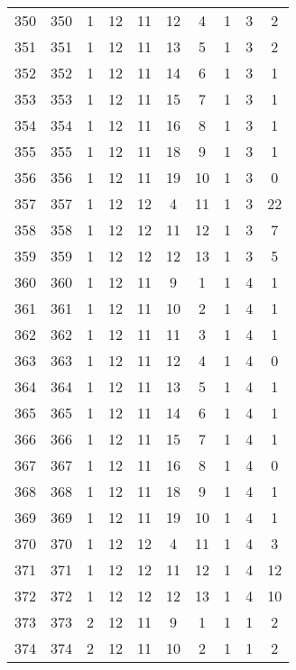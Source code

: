 \begin{longtable}{cccccccccc}
  350 & 350 &   1 &  12 &  11 &  12 &   4 &   1 &   3 &   2 \\ 
  351 & 351 &   1 &  12 &  11 &  13 &   5 &   1 &   3 &   2 \\ 
  352 & 352 &   1 &  12 &  11 &  14 &   6 &   1 &   3 &   1 \\ 
  353 & 353 &   1 &  12 &  11 &  15 &   7 &   1 &   3 &   1 \\ 
  354 & 354 &   1 &  12 &  11 &  16 &   8 &   1 &   3 &   1 \\ 
  355 & 355 &   1 &  12 &  11 &  18 &   9 &   1 &   3 &   1 \\ 
  356 & 356 &   1 &  12 &  11 &  19 &  10 &   1 &   3 &   0 \\ 
  357 & 357 &   1 &  12 &  12 &   4 &  11 &   1 &   3 &  22 \\ 
  358 & 358 &   1 &  12 &  12 &  11 &  12 &   1 &   3 &   7 \\ 
  359 & 359 &   1 &  12 &  12 &  12 &  13 &   1 &   3 &   5 \\ 
  360 & 360 &   1 &  12 &  11 &   9 &   1 &   1 &   4 &   1 \\ 
  361 & 361 &   1 &  12 &  11 &  10 &   2 &   1 &   4 &   1 \\ 
  362 & 362 &   1 &  12 &  11 &  11 &   3 &   1 &   4 &   1 \\ 
  363 & 363 &   1 &  12 &  11 &  12 &   4 &   1 &   4 &   0 \\ 
  364 & 364 &   1 &  12 &  11 &  13 &   5 &   1 &   4 &   1 \\ 
  365 & 365 &   1 &  12 &  11 &  14 &   6 &   1 &   4 &   1 \\ 
  366 & 366 &   1 &  12 &  11 &  15 &   7 &   1 &   4 &   1 \\ 
  367 & 367 &   1 &  12 &  11 &  16 &   8 &   1 &   4 &   0 \\ 
  368 & 368 &   1 &  12 &  11 &  18 &   9 &   1 &   4 &   1 \\ 
  369 & 369 &   1 &  12 &  11 &  19 &  10 &   1 &   4 &   1 \\ 
  370 & 370 &   1 &  12 &  12 &   4 &  11 &   1 &   4 &   3 \\ 
  371 & 371 &   1 &  12 &  12 &  11 &  12 &   1 &   4 &  12 \\ 
  372 & 372 &   1 &  12 &  12 &  12 &  13 &   1 &   4 &  10 \\ 
  373 & 373 &   2 &  12 &  11 &   9 &   1 &   1 &   1 &   2 \\ 
  374 & 374 &   2 &  12 &  11 &  10 &   2 &   1 &   1 &   2 \\ 

\end{longtable}
